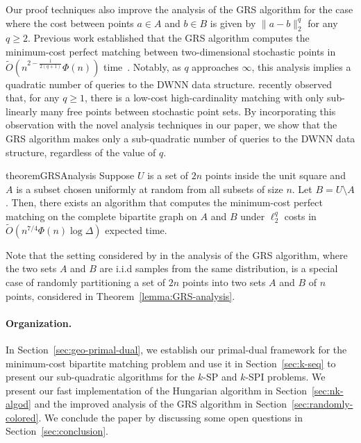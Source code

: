 \documentclass[11pt,onecolumn]{article}
\begin{document}
%
 

%
%

%

Our proof techniques also improve the analysis of the GRS algorithm for the case where the cost between points $a \in A$ and $b \in B$ is given by $\|a-b\|_2^q$ for any $q \ge 2$. Previous work established that the GRS algorithm computes the minimum-cost perfect matching between two-dimensional stochastic points in $\tilde{O}(n^{2-\frac{1}{2(q+1)}}\Phi(n))$ time~\cite{gattani2023robust}. Notably, as $q$ approaches $\infty$, this analysis implies a quadratic number of queries to the DWNN data structure.
\citet{raghvendra2024new} recently observed that, for any $q\ge1$, there is a low-cost high-cardinality matching with only sub-linearly many free points between stochastic point sets. By incorporating this observation with the novel analysis techniques in our paper, we show that the GRS algorithm makes only a sub-quadratic number of queries to the DWNN data structure, regardless of the value of $q$. 
  
%


\begin{restatable}{theorem}{GRSAnalysis}\label{lemma:GRS-analysis}
    Suppose $U$ is a set of $2n$ points inside the unit square and $A$ is a subset chosen uniformly at random from all subsets of size $n$. Let $B=U\setminus A$.  Then, there exists an algorithm that computes the minimum-cost perfect matching on the complete bipartite graph on $A$ and $B$ under $\ell_2^q$ costs in $\tilde{O}(n^{7/4}\Phi(n)\log \Delta)$ expected time.
\end{restatable}


Note that the setting considered by \citet{gattani2023robust} in the analysis of the GRS algorithm, where the two sets $A$ and $B$ are i.i.d samples from the same distribution, is a special case of randomly partitioning a set of $2n$ points into two sets $A$ and $B$ of $n$ points, considered in Theorem~\ref{lemma:GRS-analysis}.


%

%


%



\paragraph{Organization.} In Section~\ref{sec:geo-primal-dual}, we establish our primal-dual framework for the minimum-cost bipartite matching problem and use it in Section~\ref{sec:k-seq} to present our sub-quadratic algorithms for the $k$-SP and $k$-SPI problems. We present our fast implementation of the Hungarian algorithm in Section~\ref{sec:nk-algod} and the improved analysis of the GRS algorithm in Section~\ref{sec:randomly-colored}. We conclude the paper by discussing some open questions in Section~\ref{sec:conclusion}.
\end{document}
